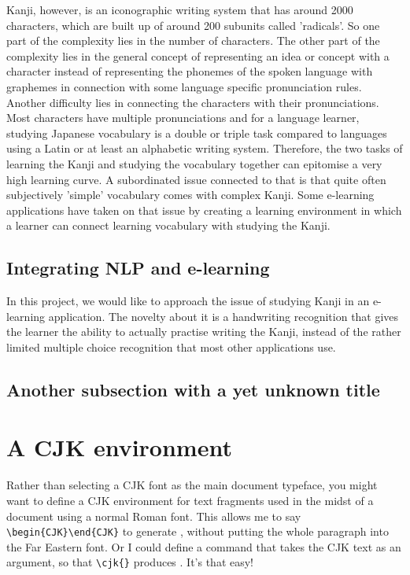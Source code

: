 Kanji, however, is an iconographic writing system that has around 2000 characters, which are built up of around 200 subunits called 'radicals'. So one part of the complexity lies in the number of characters. The other part of the complexity lies in the general concept of representing an idea or concept with a character instead of representing the phonemes of the spoken language with graphemes in connection with some language specific pronunciation rules. Another difficulty lies in connecting the characters with their pronunciations. Most characters have multiple pronunciations and for a language learner, studying Japanese vocabulary is a double or triple task compared to languages using a Latin or at least an alphabetic writing system. Therefore, the two tasks of learning the Kanji and studying the vocabulary together can epitomise a very high learning curve. A subordinated issue connected to that is that quite often subjectively 'simple' vocabulary comes with complex Kanji.
Some e-learning applications have taken on that issue by creating a learning environment in which a learner can connect learning vocabulary with studying the Kanji.

\subsection{Integrating NLP and e-learning}
In this project, we would like to approach the issue of studying Kanji in an e-learning application. The novelty about it is a handwriting recognition that gives the learner the ability to actually practise writing the Kanji, instead of the rather limited multiple choice recognition that most other applications use.


\subsection{Another subsection with a yet unknown title}

\section{A CJK environment}

Rather than selecting a CJK font as the main document typeface, you might want to define a CJK environment for text fragments used in the midst of a document using a normal Roman font. This allows me to say 
\verb|\begin{CJK}|\verb|\end{CJK}| to generate , without putting the whole paragraph into the Far Eastern font. Or I could define a command that takes the CJK text as an argument, so that \verb|\cjk{|\verb|}| produces . It's that easy!

